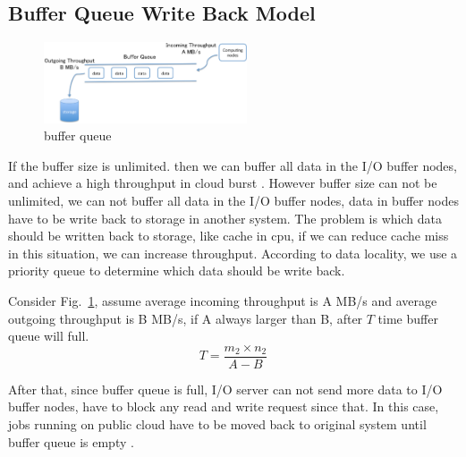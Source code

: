 
\subsection{Buffer Queue Write Back Model}

\begin{figure}[tb]
	\centering
	\includegraphics[width=6cm]{../img/buffer_queue}
	\caption{buffer queue}
	\label{buffer queue}
\end{figure}

If the buffer size is unlimited. then we can buffer all data in the I/O buffer nodes, and achieve a high throughput in cloud burst .
However buffer size can not be unlimited, we can not buffer all data in the I/O buffer nodes, data in buffer nodes have to be write back to storage in another system.
The problem is which data should be written back to storage, like cache in cpu, if we can reduce cache miss in this situation, we can increase throughput. 
According to data locality, we use a priority queue to determine which data should be write back.

Consider Fig.~\ref{buffer queue}, assume average incoming throughput is A MB/s and average outgoing throughput is B MB/s, if A always larger than B, after $T$ time buffer queue will full.
\[T=\frac{m_2\times n_2}{A-B}\]

After that, since buffer queue is full, I/O server can not send more data to I/O buffer nodes, have to block any read and write request since that.
In this case, jobs running on public cloud have to be moved back to original system until buffer queue is empty
.
